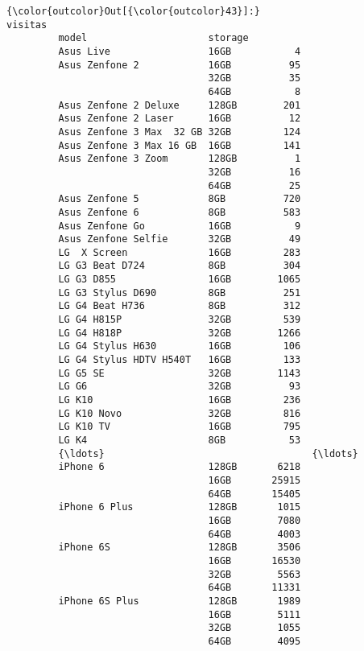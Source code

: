 \documentclass[11pt]{article}
\begin{document}
\begin{Verbatim}[commandchars=\\\{\}]
{\color{outcolor}Out[{\color{outcolor}43}]:}                                    visitas
         model                     storage         
         Asus Live                 16GB           4
         Asus Zenfone 2            16GB          95
                                   32GB          35
                                   64GB           8
         Asus Zenfone 2 Deluxe     128GB        201
         Asus Zenfone 2 Laser      16GB          12
         Asus Zenfone 3 Max  32 GB 32GB         124
         Asus Zenfone 3 Max 16 GB  16GB         141
         Asus Zenfone 3 Zoom       128GB          1
                                   32GB          16
                                   64GB          25
         Asus Zenfone 5            8GB          720
         Asus Zenfone 6            8GB          583
         Asus Zenfone Go           16GB           9
         Asus Zenfone Selfie       32GB          49
         LG  X Screen              16GB         283
         LG G3 Beat D724           8GB          304
         LG G3 D855                16GB        1065
         LG G3 Stylus D690         8GB          251
         LG G4 Beat H736           8GB          312
         LG G4 H815P               32GB         539
         LG G4 H818P               32GB        1266
         LG G4 Stylus H630         16GB         106
         LG G4 Stylus HDTV H540T   16GB         133
         LG G5 SE                  32GB        1143
         LG G6                     32GB          93
         LG K10                    16GB         236
         LG K10 Novo               32GB         816
         LG K10 TV                 16GB         795
         LG K4                     8GB           53
         {\ldots}                                    {\ldots}
         iPhone 6                  128GB       6218
                                   16GB       25915
                                   64GB       15405
         iPhone 6 Plus             128GB       1015
                                   16GB        7080
                                   64GB        4003
         iPhone 6S                 128GB       3506
                                   16GB       16530
                                   32GB        5563
                                   64GB       11331
         iPhone 6S Plus            128GB       1989
                                   16GB        5111
                                   32GB        1055
                                   64GB        4095

\end{Verbatim}
\end{document}
